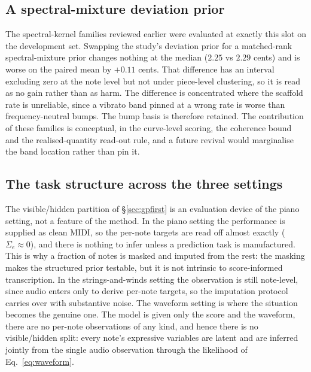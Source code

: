 \subsection{A spectral-mixture deviation prior}

The spectral-kernel families reviewed earlier
\cite{wilson2013,remes2017,alvarado2016} were evaluated at exactly this
slot on the development set. Swapping the study's deviation prior for a
matched-rank spectral-mixture prior changes nothing at the median ($2.25$
vs $2.29$ cents) and is worse on the paired mean by $+0.11$ cents. That
difference has an interval excluding zero at the note level but not under
piece-level clustering, so it is read as no gain rather than as harm. The
difference is concentrated where the scaffold rate is unreliable, since a
vibrato band pinned at a wrong rate is worse than frequency-neutral bumps.
The bump basis is therefore retained. The contribution of these families is
conceptual, in the curve-level scoring, the coherence bound and the
realised-quantity read-out rule, and a future revival would marginalise the
band location rather than pin it.

\subsection{The task structure across the three settings}

The visible/hidden partition of \S\ref{sec:gpfirst} is an evaluation device
of the piano setting, not a feature of the method. In the piano setting the
performance is supplied as clean MIDI, so the per-note targets are read off
almost exactly ($\Sigma_e \approx 0$), and there is nothing to infer unless
a prediction task is manufactured. This is why a fraction of notes is masked
and imputed from the rest: the masking makes the structured prior testable,
but it is not intrinsic to score-informed transcription. In the
strings-and-winds setting the observation is still note-level, since audio
enters only to derive per-note targets, so the imputation protocol carries
over with substantive noise. The waveform setting is where the situation
becomes the genuine one. The model is given only the score and the waveform,
there are no per-note observations of any kind, and hence there is no
visible/hidden split: every note's expressive variables are latent and are
inferred jointly from the single audio observation through the likelihood
of Eq.~\eqref{eq:waveform}.

